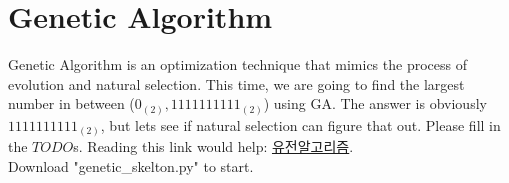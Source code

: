 \documentclass{article}
\begin{document}
\section{Genetic Algorithm}
Genetic Algorithm is an optimization technique that mimics the process of
evolution and natural selection. This time, we are going to find the largest
number in between ($0_{(2)}, 1111111111_{(2)}$) using GA. The answer
is obviously $1111111111_{(2)}$, but lets see if natural selection can figure that out.
Please fill in the $TODO$s. Reading this link would help:
\href{https://namu.wiki/w/유전알고리즘}{유전알고리즘}.\\
Download "genetic\_skelton.py" to start.
\end{document}
